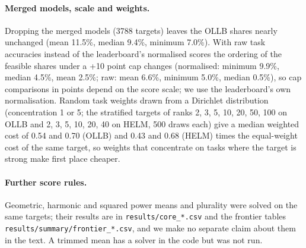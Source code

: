 \documentclass{article}
\begin{document}
\paragraph{Merged models, scale and weights.} Dropping the merged models (3788 targets) leaves the OLLB shares nearly unchanged (mean 11.5\%, median 9.4\%, minimum 7.0\%). With raw task accuracies instead of the leaderboard's normalised scores the ordering of the feasible shares under a +10 point cap changes (normalised: minimum 9.9\%, median 4.5\%, mean 2.5\%; raw: mean 6.6\%, minimum 5.0\%, median 0.5\%), so cap comparisons in points depend on the score scale; we use the leaderboard's own normalisation. Random task weights drawn from a Dirichlet distribution (concentration 1 or 5; the stratified targets of ranks 2, 3, 5, 10, 20, 50, 100 on OLLB and 2, 3, 5, 10, 20, 40 on HELM, 500 draws each) give a median weighted cost of 0.54 and 0.70 (OLLB) and 0.43 and 0.68 (HELM) times the equal-weight cost of the same target, so weights that concentrate on tasks where the target is strong make first place cheaper.
\paragraph{Further score rules.} Geometric, harmonic and squared power means and plurality were solved on the same targets; their results are in \texttt{results/core\_*.csv} and the frontier tables \texttt{results/summary/frontier\_*.csv}, and we make no separate claim about them in the text. A trimmed mean has a solver in the code but was not run.
\end{document}
